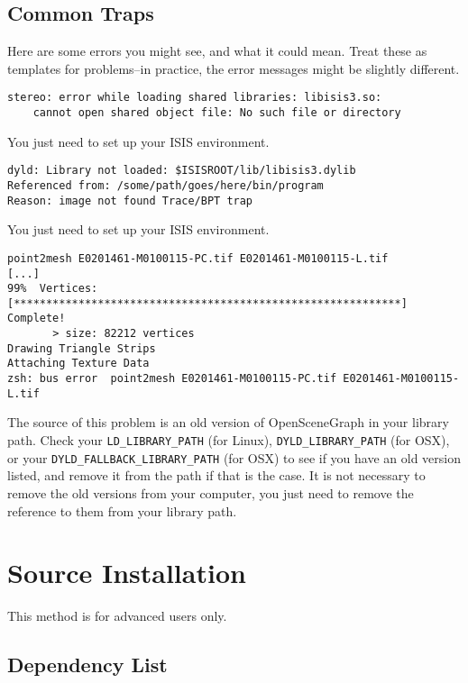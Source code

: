 \subsection{Common Traps}

Here are some errors you might see, and what it could mean. Treat
these as templates for problems--in practice, the error messages might
be slightly different.

\begin{verbatim}
stereo: error while loading shared libraries: libisis3.so:
    cannot open shared object file: No such file or directory
\end{verbatim}

You just need to set up your ISIS environment.

\begin{verbatim}
dyld: Library not loaded: $ISISROOT/lib/libisis3.dylib
Referenced from: /some/path/goes/here/bin/program
Reason: image not found Trace/BPT trap
\end{verbatim}

You just need to set up your ISIS environment.

\begin{verbatim}
point2mesh E0201461-M0100115-PC.tif E0201461-M0100115-L.tif
[...]
99%  Vertices:   [************************************************************] Complete!
       > size: 82212 vertices
Drawing Triangle Strips
Attaching Texture Data
zsh: bus error  point2mesh E0201461-M0100115-PC.tif E0201461-M0100115-L.tif
\end{verbatim}

The source of this problem is an old version of OpenSceneGraph in
your library path. Check your \verb#LD_LIBRARY_PATH# (for Linux),
\verb#DYLD_LIBRARY_PATH# (for OSX), or your \verb#DYLD_FALLBACK_LIBRARY_PATH#
(for OSX) to see if you have an old version listed, and remove it
from the path if that is the case. It is not necessary to remove the
old versions from your computer, you just need to remove the reference
to them from your library path.

\pagebreak
\section{\label{sec:Source-Installation}Source Installation}

This method is for advanced users only.

\subsection{Dependency List}

